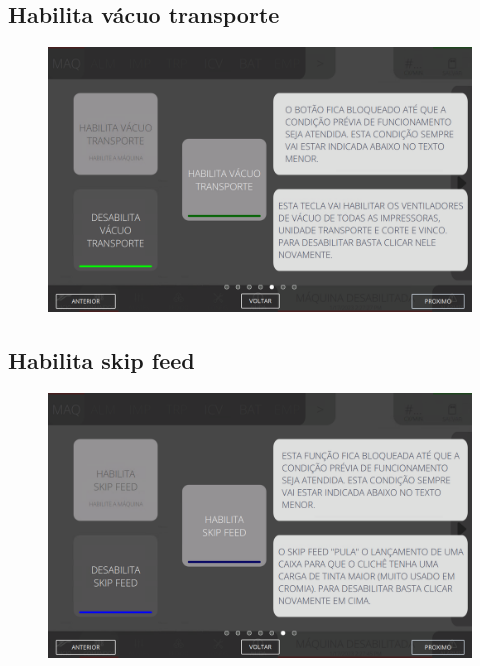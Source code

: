 \newpage
\thispagestyle{fancy}
\vspace*{40 pt}
\subsection{Habilita vácuo transporte}
\vspace*{\fill}
\begin{figure}[h]
    \centering
    \includegraphics[width=576 px,height=360 px]{src/imagesICV/02-machine/6.png}
\end{figure}
\vspace*{\fill}

\newpage
\thispagestyle{fancy}
\vspace*{40 pt}
\subsection{Habilita skip feed}
\vspace*{\fill}
\begin{figure}[h]
    \centering
    \includegraphics[width=576 px,height=360 px]{src/imagesICV/02-machine/7.png}
\end{figure}
\vspace*{\fill}

